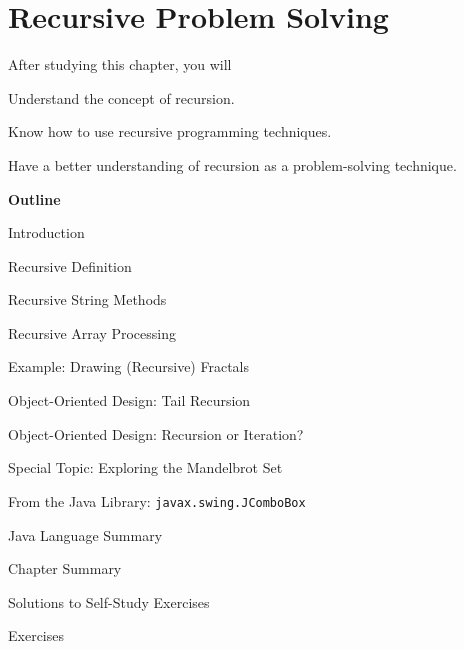 \setcounter{SSTUDYcount}{1}
\setcounter{chapter}{11}
\chapter{Recursive Problem Solving}
\label{chapter-recursion}



\CObegin
{}

\noindent After studying this chapter, you will

\begin{COBL}
\item  Understand the concept of recursion.
\item  Know how to use recursive programming techniques.
\item  Have a better understanding of recursion as a
problem-solving technique.
\end{COBL}

{\bf \large Outline}

\begin{COL}
\item {Introduction}
\item {Recursive Definition}
\item {Recursive String Methods}
\item {Recursive Array Processing}
\item {Example: Drawing (Recursive) Fractals}
\item {Object-Oriented Design: Tail Recursion}
\item {Object-Oriented Design: Recursion or Iteration?}
\item[] {{\color{cyan}Special Topic:} Exploring the Mandelbrot Set}
\item {From the Java Library: {\tt javax.swing.JComboBox}}
\item[] {Java Language Summary}
\par\small\item[] {Chapter Summary}
\par\small\item[] {Solutions to Self-Study Exercises}
\par\small\item[] {Exercises}
\end{COL}
\COend



